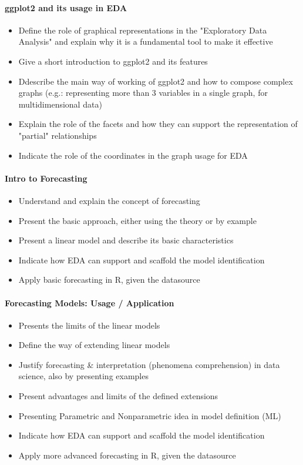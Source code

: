 \documentclass[a4paper]{article}
\begin{document}
		\paragraph{ggplot2 and its usage in EDA}
		
			\begin{itemize}
				\item Define the role of graphical representations in the "Exploratory Data Analysis" and explain why it is a fundamental tool to make it effective
				\item Give a short introduction to ggplot2 and its features
				\item Ddescribe the main way of working of ggplot2 and how to compose complex graphs (e.g.: representing more than 3 variables in a single graph, for multidimensional data)
				\item Explain the role of the facets and how they can support the representation of "partial" relationships
				\item Indicate the role of the coordinates in the graph usage for EDA
			\end{itemize}
		
		\paragraph{Intro to Forecasting}
		
			\begin{itemize}
				\item Understand and explain the concept of forecasting
				\item Present the basic approach, either using the theory or by example
				\item Present a linear model and describe its basic characteristics
				\item Indicate how EDA can support and scaffold the model identification
				\item Apply basic forecasting in R, given the datasource
			\end{itemize}
		
		\paragraph{Forecasting Models: Usage / Application}
		
			\begin{itemize}
				\item Presents the limits of the linear models
				\item Define the way of extending linear models
				\item Justify forecasting \& interpretation (phenomena comprehension) in data science, also by presenting examples
				\item Present advantages and limits of the defined extensions
				\item Presenting Parametric and Nonparametric idea in model definition (ML)
				\item Indicate how EDA can support and scaffold the model identification
				\item Apply more advanced forecasting in R, given the datasource
			\end{itemize}
		
\end{document}
